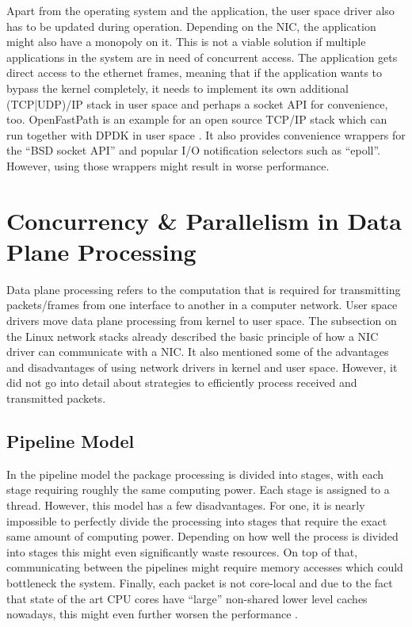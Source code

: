 Apart from the operating system and the application, the user space driver also has to be updated during operation. \newline
Depending on the NIC, the application might also have a monopoly on it. This is not a viable solution if multiple applications in the system are in need of concurrent access. \newline
The application gets direct access to the ethernet frames, meaning that if the application wants to bypass the kernel completely, it needs to implement its own additional (TCP|UDP)/IP stack in user space and perhaps a socket API for convenience, too. OpenFastPath is an example for an open source TCP/IP stack which can run together with DPDK in user space \cite{soft:opf}. It also provides convenience wrappers for the “BSD socket API” and popular I/O notification selectors such as “epoll”. However, using those wrappers might result in worse performance.

\section{Concurrency \& Parallelism in Data Plane Processing}
Data plane processing refers to the computation that is required for transmitting packets/frames from one interface to another in a computer network. User space drivers move data plane processing from kernel to user space. The subsection on the Linux network stacks already described the basic principle of how a NIC driver can communicate with a NIC. It also mentioned some of the advantages and disadvantages of using network drivers in kernel and user space. However, it did not go into detail about strategies to efficiently process received and transmitted packets.
\subsection{Pipeline Model}
In the pipeline model the package processing is divided into stages, with each stage requiring roughly the same computing power. Each stage is assigned to a thread.
However, this model has a few disadvantages. For one, it is nearly impossible to perfectly divide the processing into stages that require the exact same amount of computing power. Depending on how well the process is divided into stages this might even significantly waste resources. On top of that, communicating between the pipelines might require memory accesses which could bottleneck the system. Finally, each packet is not core-local and due to the fact that state of the art CPU cores have “large” non-shared lower level caches nowadays, this might even further worsen the performance \cite{intel:packet}.
